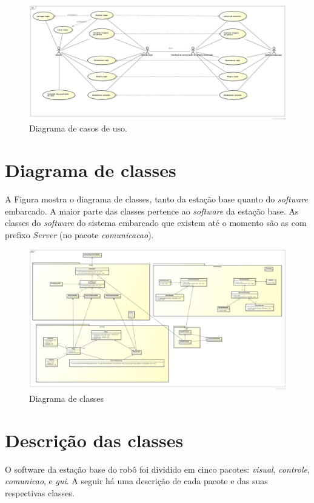 \begin{figure}[H]
  \centering
  \includegraphics[width=\textwidth, keepaspectratio]{./figuras/diagrama_casos_de_uso.png}
  \caption{Diagrama de casos de uso.}
  \label{fig:diagrama_casos_de_uso}
\end{figure}

\section{Diagrama de classes}

A Figura \label{fig:diagrama_classes} mostra o diagrama de classes, tanto da estação base quanto do \textit{software} embarcado. A maior parte das classes pertence ao \textit{software} da estação base. As classes do \textit{software} do sistema embarcado que existem até o momento são as com prefixo \textit{Server} (no pacote \textit{comunicacao}). 

\begin{figure}[H]
  \centering
  \includegraphics[width=\textwidth]{./figuras/diagrama_classes.jpg}
  \caption{Diagrama de classes}
  \label{fig:diagrama_classes}
\end{figure}

\section{Descrição das classes}
O software da estação base do robô foi dividido em cinco pacotes:  \textit{visual}, \textit{controle}, \textit{comunicao}, e \textit{gui}. A seguir há uma descrição de cada pacote e das suas respectivas classes.


